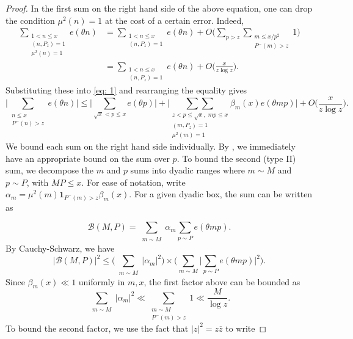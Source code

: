 \documentclass[12pt]{amsart}
\renewcommand{\le}{\leqslant}
\renewcommand{\leq}{\leqslant}
\numberwithin{equation}{section}
\theoremstyle{plain}
\theoremstyle{definition}
\newcommand{\CB}{\mathcal{B}}
\begin{document}
\begin{proof}
		In the first sum on the right hand side of the above equation, one can drop the condition $\mu^2(n) = 1$ at the cost of a certain error. Indeed,
		\begin{align*}
			\sum_{\substack{1< n \leq x \\ (n,P_z)=1 \\ \mu^2(n) = 1}} e(\theta n) &= \sum_{\substack{1< n \leq x \\ (n,P_z)=1}} e(\theta n) + O\bigg(\sum_{p > z} \sum_{\substack{m \leq x/p^2 \\ P^-(m) > z}}1\bigg)\\
			&= \sum_{\substack{1< n \leq x \\ (n,P_z)=1}} e(\theta n) + O\bigg(\frac{x}{z \log z}\bigg).
		\end{align*}
		Substituting these into \eqref{eq: 1} and rearranging the equality gives
		\begin{equation}\label{eq: 2}
			\bigg|\sum_{\substack{n \leq x \\ P^-(n) > z}} e(\theta n) \bigg| \le \bigg|\sum_{\sqrt{x} < p \leq x}e(\theta p)\bigg| + \bigg| \underset{ \substack{z< p \leq \sqrt{x},\;mp\leq x \\ (m,P_z) = 1 \\ \mu^2(m) = 1}}{\sum \sum}\beta_m(x)e(\theta mp) \bigg| + O\bigg(\frac{x}{z \log z}\bigg).
		\end{equation}
		We bound each sum on the right hand side individually. By , we immediately have an appropriate bound on the sum over $p$. To bound the second (type II) sum, we decompose the $m$ and $p$ sums into dyadic ranges where $m \sim M$ and $p \sim P$, with $MP \leq x$. For ease of notation, write $\alpha_m = \mu^2(m) \bm{1}_{P^-(m) > z} \beta_m(x).$ For a given dyadic box, the sum can be written as 
		
		$$\CB(M,P) = \sum_{\substack{m \sim M }} \alpha_m \sum_{p \sim P}e(\theta m p).$$
		By Cauchy-Schwarz, we have
		$$|\CB(M,P)|^2 \leq \bigg(\sum_{\substack{m \sim M}} |\alpha_m|^2\bigg)\times\bigg( \sum_{m \sim M}\bigg|\sum_{p \sim P}e(\theta m p)\bigg|^2\bigg).$$
		Since $\beta_m(x) \ll 1$ uniformly in $m,x$, the first factor above can be bounded as
		$$\sum_{\substack{m \sim M}} |\alpha_m|^2 \ll \sum_{\substack{
				m \sim M \\ P^-(m) > z}} 1 \ll \frac{M}{\log z}.$$
		To bound the second factor, we use the fact that $|z|^2 = z \overline{z}$ to write
		

\end{proof}
\end{document}
